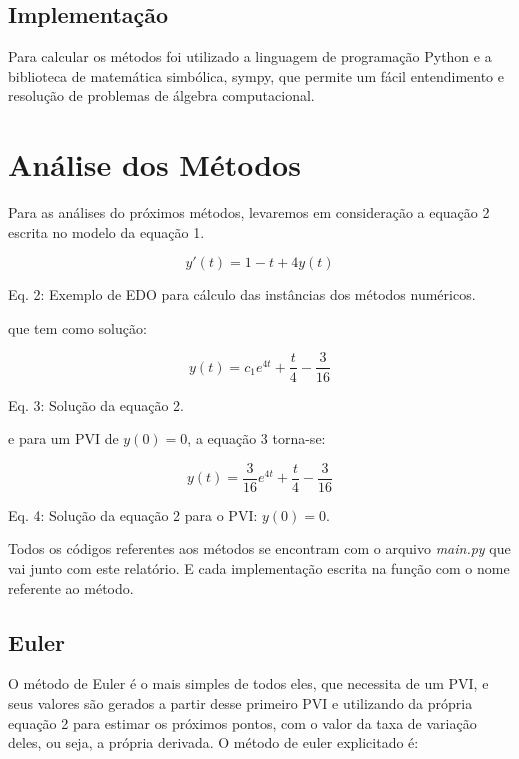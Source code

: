 \documentclass[a4paper]{article}
\begin{document}
\subsection{Implementação}
Para calcular os métodos foi utilizado a linguagem de programação Python e a biblioteca de matemática simbólica, sympy, que permite um fácil entendimento e resolução de problemas de álgebra computacional.

\section{Análise dos Métodos}
Para as análises do próximos métodos, levaremos em consideração a equação 2 escrita no modelo da equação 1.

\begin{equation}
y'(t) = 1 - t + 4y(t)
\end{equation}
\centerline{Eq. 2: Exemplo de EDO para cálculo das instâncias dos métodos numéricos.}\par

que tem como solução:
\par
\begin{equation}
   y(t) = c_1e^{4t} + \frac{t}{4} - \frac{3}{16} 
\end{equation}
\centerline{Eq. 3: Solução da equação 2.}
\smallskip\par
e para um PVI de $y(0) = 0$, a equação 3 torna-se:

\begin{equation}
  y(t) = \frac{3}{16}e^{4t} + \frac{t}{4} - \frac{3}{16}  
\end{equation}
\centerline{Eq. 4: Solução da equação 2 para o PVI: $y(0) = 0$.}\bigskip\par

Todos os códigos referentes aos métodos se encontram com o arquivo \textit{main.py} que vai junto com este relatório. E cada implementação escrita na função com o nome referente ao método.


\newpage
\subsection{Euler}

O método de Euler é o mais simples de todos eles, que necessita de um PVI, e seus valores são gerados a partir desse primeiro PVI e utilizando da própria equação 2 para estimar os próximos pontos, com o valor da taxa de variação deles, ou seja, a própria derivada.
O método de euler explicitado é:
\end{document}
